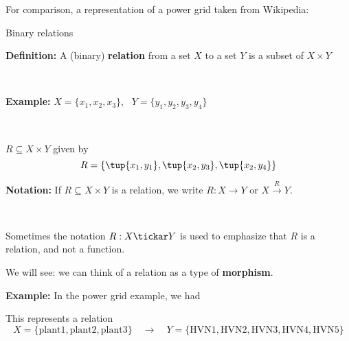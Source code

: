\begin{frame}[fragile]{}

For comparison, a representation of a power grid taken from Wikipedia: 

\vfill \vfill \vfill \vfill \vfill \vfill \vfill \vfill \vfill 

\end{frame}



\begin{frame}[fragile]{Binary relations}

\textbf{Definition:} A (binary) \textbf{relation} from a set $X$ to a set $Y$ is a subset of $X \times Y$

\

\textbf{Example:}  $X = \{ x_1, x_2, x_3 \}$, \  $Y = \{ y_1, y_2, y_3, y_4 \}$

\

$R \subseteq X \times Y$ given by  $$R = \{ \tup{x_1, y_1}, \tup{x_2, y_3}, \tup{x_2, y_4}  \}$$


\vfill \vfill \vfill \vfill \vfill \vfill \vfill \vfill \vfill \vfill \vfill \vfill 


\end{frame}




\begin{frame}[fragile]




 \vfill 

\textbf{Notation:} If $R \subseteq X \times Y$ is a relation, we write $R: X \rightarrow Y$ or $X \overset{R}{\rightarrow} Y$. 

\

Sometimes the notation $R: X \tickar Y$ is used to emphasize that $R$ is a relation, and not a function. 


\vfill  \vfill \vfill 
 
We will see: we can think of a relation as a type of \textbf{morphism}.

\vfill \vfill \vfill \vfill 




\end{frame}




\begin{frame}[fragile]

\textbf{Example:} 
In the power grid example, we had 

\vfill \vfill \vfill \vfill \vfill \vfill 

This represents a relation 
$$X = \{ \text{plant1}, \text{plant2}, \text{plant3} \} \quad \longrightarrow \quad Y = \{ \text{HVN1}, \text{HVN2}, \text{HVN3}, \text{HVN4},  \text{HVN5} \}$$

\end{frame}







